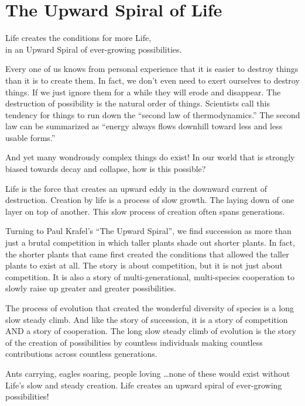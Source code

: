 \documentclass[ebook,12pt,openany,twoside]{memoir}
\newcommand{\tab}{\hspace*{2em}}
\newcommand{\imagefacingchapter}[1]{
  \cleartoverso
  \clearpage \null
  \thispagestyle{cleared}
  \AddToShipoutPictureBG*{%
    \AtStockLowerLeft{%
      \texttt{[image: \#1]}
    }
  }
  \clearpage
}
\begin{document}
\imagefacingchapter{images/UpwardSpiral}
\chapter{The Upward Spiral of Life}

\setlength\epigraphwidth{3.6in}
\epigraph{
  Life creates the conditions for more Life,\\
  \tab in an Upward Spiral of ever-growing possibilities.\\
}{}

\noindent Every one of us knows from personal experience that it is easier to
destroy things than it is to create them. In fact, we don't even need to exert
ourselves to destroy things. If we just ignore them for a while they will erode
and disappear. The destruction of possibility is the natural order of things.
Scientists call this tendency for things to run down the ``second law of
thermodynamics.'' The second law can be summarized as ``energy always flows
downhill toward less and less usable forms.''

And yet many wondrously complex things do exist! In our world that is strongly
biased towards decay and collapse, how is this possible?

Life is the force that creates an upward eddy in the downward current of
destruction. Creation by life is a process of slow growth. The laying down of
one layer on top of another. This slow process of creation often spans
generations.

Turning to Paul Krafel's ``The Upward Spiral'', we find succession as more than
just a brutal competition in which taller plants shade out shorter plants. In
fact, the shorter plants that came first created the conditions that allowed
the taller plants to exist at all. The story is about competition, but it is
not just about competition. It is also a story of multi-generational,
multi-species cooperation to slowly raise up greater and greater possibilities.

The process of evolution that created the wonderful diversity of species is a
long slow steady climb. And like the story of succession, it is a story of
competition AND a story of cooperation. The long slow steady climb of evolution
is the story of the creation of possibilities by countless individuals making
countless contributions across countless generations.

Ants carrying, eagles soaring, people loving \ldots none of these would exist
without Life's slow and steady creation. Life creates an upward spiral of
ever-growing possibilities!
\end{document}
